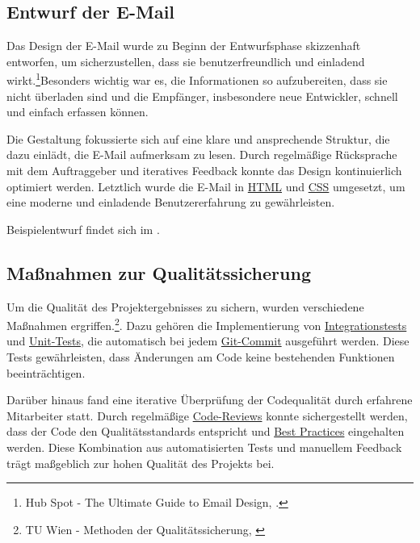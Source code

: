 \subsection{Entwurf der E-Mail}
\label{sec:Benutzeroberflaeche}

Das Design der E-Mail wurde zu Beginn der Entwurfsphase skizzenhaft entworfen, um sicherzustellen, dass sie benutzerfreundlich und einladend wirkt.\footnote{Hub Spot - The Ultimate Guide to Email Design, \cite{HubSpot}.}Besonders wichtig war es, die Informationen so aufzubereiten, dass sie nicht überladen sind und die Empfänger, insbesondere neue Entwickler, schnell und einfach erfassen können. 

Die Gestaltung fokussierte sich auf eine klare und ansprechende Struktur, die dazu einlädt, die E-Mail aufmerksam zu lesen. Durch regelmäßige Rücksprache mit dem Auftraggeber und iteratives Feedback konnte das Design kontinuierlich optimiert werden. Letztlich wurde die E-Mail in \hyperlink{HTML}{\textcolor{AOBlau}{HTML}} und \hyperlink{CSS}{\textcolor{AOBlau}{CSS}} umgesetzt, um eine moderne und einladende Benutzererfahrung zu gewährleisten.

Beispielentwurf findet sich im .

\subsection{Maßnahmen zur Qualitätssicherung}
\label{sec:Qualitaetssicherung}

Um die Qualität des Projektergebnisses zu sichern, wurden verschiedene Maßnahmen ergriffen.\footnote{TU Wien - Methoden der Qualitätssicherung, \cite{Quality}}. Dazu gehören die Implementierung von \hyperlink{IntegrationTests}{\textcolor{AOBlau}{Integrationstests}} und \hyperlink{UnitTests}{\textcolor{AOBlau}{Unit-Tests}}, die automatisch bei jedem \hyperlink{GitLab}{\textcolor{AOBlau}{Git-Commit}} ausgeführt werden. Diese Tests gewährleisten, dass Änderungen am Code keine bestehenden Funktionen beeinträchtigen.

Darüber hinaus fand eine iterative Überprüfung der Codequalität durch erfahrene Mitarbeiter statt. Durch regelmäßige \hyperlink{CodeReview}{\textcolor{AOBlau}{Code-Reviews}} konnte sichergestellt werden, dass der Code den Qualitätsstandards entspricht und \hyperlink{BestPractices}{\textcolor{AOBlau}{Best Practices}} eingehalten werden. Diese Kombination aus automatisierten Tests und manuellem Feedback trägt maßgeblich zur hohen Qualität des Projekts bei.
